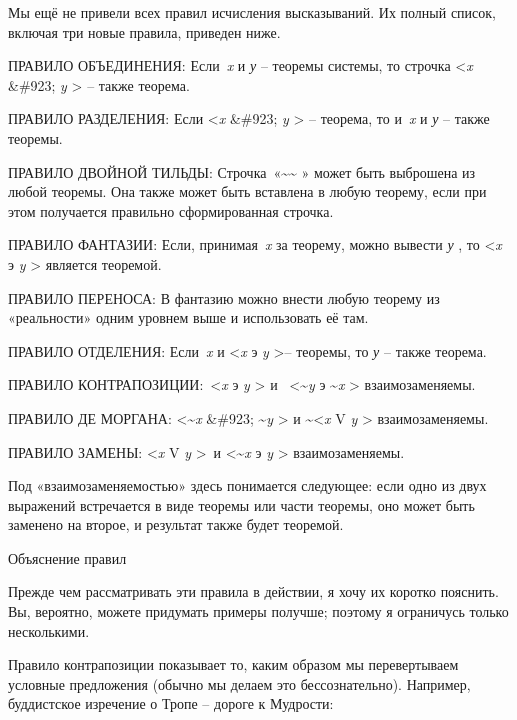 \documentclass[../main.tex]{subfiles}
\begin{document}
Мы ещё не привели всех правил исчисления высказываний. Их полный список, включая три новые правила, приведен ниже.

ПРАВИЛО ОБЪЕДИНЕНИЯ: Если~\emph{x} и \emph{у} \--- теоремы системы, то строчка \textless{}\emph{x} \&\#923; \emph{y} \textgreater{} \--- также теорема.

ПРАВИЛО РАЗДЕЛЕНИЯ: Если \textless{}\emph{x} \&\#923; \emph{y} \textgreater{} \--- теорема, то и~\emph{x} и \emph{у} \--- также теоремы.

ПРАВИЛО ДВОЙНОЙ ТИЛЬДЫ: Строчка~«\textbf{\textasciitilde\textasciitilde{}} » может быть выброшена из любой теоремы. Она также может быть вставлена в любую теорему, если при этом получается правильно сформированная строчка.

ПРАВИЛО ФАНТАЗИИ: Если, принимая~\emph{x} за теорему, можно вывести \emph{у} , то \textless{}\emph{x} э \emph{y} \textgreater{} является теоремой.

ПРАВИЛО ПЕРЕНОСА: В фантазию можно внести любую теорему из «реальности» одним уровнем выше и использовать её там.

ПРАВИЛО ОТДЕЛЕНИЯ: Если~\emph{x} и \textless{}\emph{x} э \emph{y} \textgreater \--- теоремы, то \emph{у} \--- также теорема.

ПРАВИЛО КОНТРАПОЗИЦИИ:~\textless{}\emph{x} э \emph{y} \textgreater{} и~ \textless\textasciitilde{}\emph{y} э \textasciitilde{}\emph{x} \textgreater{} взаимозаменяемы.

ПРАВИЛО ДЕ МОРГАНА: \textless\textasciitilde{}\emph{x} \&\#923; \textasciitilde{}\emph{y} \textgreater{} и \textasciitilde\textless{}\emph{x} V \emph{y} \textgreater{} взаимозаменяемы.

ПРАВИЛО ЗАМЕНЫ: \textless{}\emph{x} V \emph{y} \textgreater~и \textless\textasciitilde{}\emph{x} э \emph{y} \textgreater{} взаимозаменяемы.

Под «взаимозаменяемостью» здесь понимается следующее: если одно из двух выражений встречается в виде теоремы или части теоремы, оно может быть заменено на второе, и результат также будет теоремой.

Объяснение правил

Прежде чем рассматривать эти правила в действии, я хочу их коротко пояснить. Вы, вероятно, можете придумать примеры получше; поэтому я ограничусь только несколькими.

Правило контрапозиции показывает то, каким образом мы перевертываем условные предложения (обычно мы делаем это бессознательно). Например, буддистское изречение о Тропе \--- дороге к Мудрости:
\end{document}
